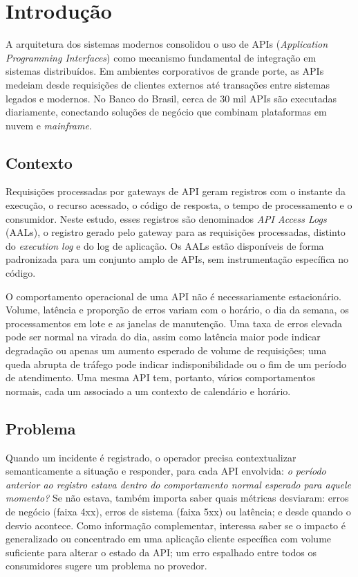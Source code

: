 \documentclass[sigconf,nonacm]{acmart}
\begin{document}
\maketitle

\section{Introdução}

A arquitetura dos sistemas modernos consolidou o uso de APIs (\emph{Application Programming Interfaces}) como mecanismo fundamental de integração em sistemas distribuídos. Em ambientes corporativos de grande porte, as APIs medeiam desde requisições de clientes externos até transações entre sistemas legados e modernos. No Banco do Brasil, cerca de 30 mil APIs são executadas diariamente, conectando soluções de negócio que combinam plataformas em nuvem e \emph{mainframe}.

\subsection{Contexto}

Requisições processadas por gateways de API geram registros com o instante da execução, o recurso acessado, o código de resposta, o tempo de processamento e o consumidor. Neste estudo, esses registros são denominados \emph{API Access Logs} (AALs), o registro gerado pelo gateway para as requisições processadas, distinto do \emph{execution log} e do log de aplicação. Os AALs estão disponíveis de forma padronizada para um conjunto amplo de APIs, sem instrumentação específica no código.

O comportamento operacional de uma API não é necessariamente estacionário. Volume, latência e proporção de erros variam com o horário, o dia da semana, os processamentos em lote e as janelas de manutenção. Uma taxa de erros elevada pode ser normal na virada do dia, assim como latência maior pode indicar degradação ou apenas um aumento esperado de volume de requisições; uma queda abrupta de tráfego pode indicar indisponibilidade ou o fim de um período de atendimento. Uma mesma API tem, portanto, vários comportamentos normais, cada um associado a um contexto de calendário e horário.

\subsection{Problema}
Quando um incidente é registrado, o operador precisa contextualizar semanticamente a situação e responder, para cada API envolvida: \emph{o período anterior ao registro estava dentro do comportamento normal esperado para aquele momento?} Se não estava, também importa saber quais métricas desviaram: erros de negócio (faixa 4xx), erros de sistema (faixa 5xx) ou latência; e desde quando o desvio acontece. Como informação complementar, interessa saber se o impacto é generalizado ou concentrado em uma aplicação cliente específica com volume suficiente para alterar o estado da API; um erro espalhado entre todos os consumidores sugere um problema no provedor.
\end{document}
